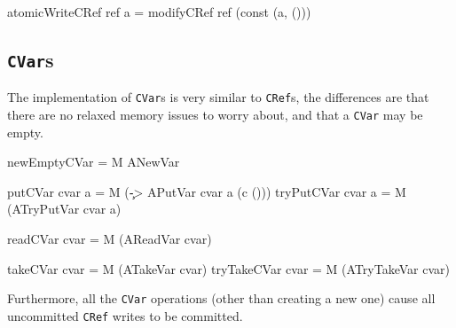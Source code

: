 \begin{haskellcode}
atomicWriteCRef ref a = modifyCRef ref (const (a, ()))
\end{haskellcode}

\subsection{\texttt{CVar}s}
\label{sec:execution-primops-cvar}

The implementation of \verb|CVar|s is very similar to \verb|CRef|s,
the differences are that there are no relaxed memory issues to worry
about, and that a \verb|CVar| may be empty.

\begin{haskellcode}
newEmptyCVar = M ANewVar
\end{haskellcode}


\begin{haskellcode}
putCVar    cvar a = M (\c -> APutVar cvar a (c ()))
tryPutCVar cvar a = M (ATryPutVar cvar a)
\end{haskellcode}



\begin{haskellcode}
readCVar cvar = M (AReadVar cvar)
\end{haskellcode}


\begin{haskellcode}
takeCVar    cvar = M (ATakeVar    cvar)
tryTakeCVar cvar = M (ATryTakeVar cvar)
\end{haskellcode}



Furthermore, all the \verb|CVar| operations (other than creating a new
one) cause all uncommitted \verb|CRef| writes to be committed.

